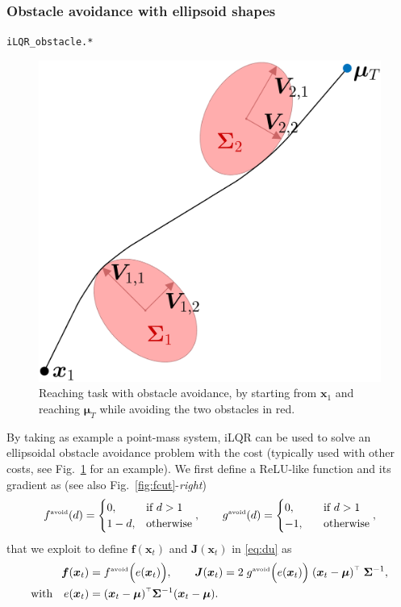 \documentclass[10pt,a4paper]{article} %
\newcommand{\trsp}{{\scriptscriptstyle\top}}
\newcommand{\tp}[1]{\text{\tiny#1}}
\newcommand{\filename}[1]{\colorbox{rr2}{\color{white}\texttt{#1}}}
\begin{document}
\subsubsection{Obstacle avoidance with ellipsoid shapes} %
\begin{flushright}
\filename{iLQR\_obstacle.*}
\end{flushright}


\begin{figure}
\centering
\includegraphics[width=.30\textwidth]{images/iLQR_ellipsoidObstacle01.png}
\caption{\footnotesize
Reaching task with obstacle avoidance, by starting from $\bm{x}_1$ and reaching $\bm{\mu}_T$ while avoiding the two obstacles in red.
}
\label{fig:iLQR_obstacle}
\vspace{-20pt}
\end{figure}

By taking as example a point-mass system, iLQR can be used to solve an ellipsoidal obstacle avoidance problem with the cost (typically used with other costs, see Fig.~\ref{fig:iLQR_obstacle} for an example). We first define a ReLU-like function and its gradient as (see also Fig.~\ref{fig:fcut}-\emph{right})
\begin{equation*} 
	f^\tp{avoid}(d) = \begin{cases} 0, & \text{if}\ d>1 \\ 1-d, & \text{otherwise} \end{cases}, \quad\quad
	g^\tp{avoid}(d) = \begin{cases} 0, \hspace{6mm} & \text{if}\ d>1 \\ -1, & \text{otherwise} \end{cases}, 
\end{equation*}
that we exploit to define $\bm{f}(\bm{x}_t)$ and $\bm{J}(\bm{x}_t)$ in \eqref{eq:du} as
\begin{align*}
	\bm{f}(\bm{x}_t) &= f^\tp{avoid}\Big( e(\bm{x}_t) \Big), \quad\quad
	\bm{J}(\bm{x}_t) = 2 \; g^\tp{avoid}\Big( e(\bm{x}_t) \Big) \; {(\bm{x}_t-\bm{\mu})}^\trsp \; \bm{\Sigma}^{-1} ,\\
	\text{with}\quad e(\bm{x}_t) &= {(\bm{x}_t-\bm{\mu})}^\trsp \bm{\Sigma}^{-1} (\bm{x}_t-\bm{\mu}).
\end{align*}
\end{document}
